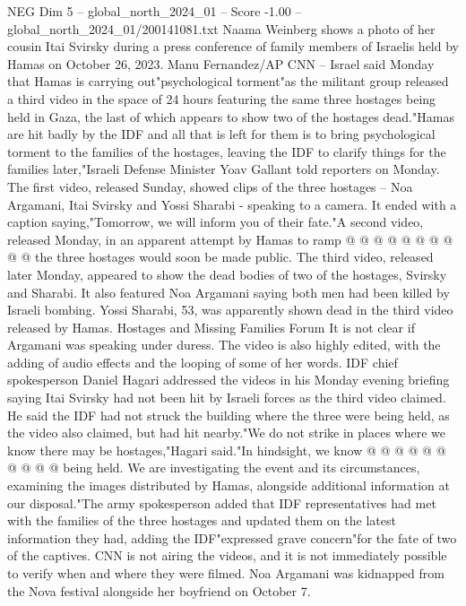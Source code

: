 \begin{textsample}{NEG Dim 5 – global\_north\_2024\_01 – Score -1.00 – global\_north\_2024\_01/200141081.txt}  \label{ex:f5_neg_313}
Naama Weinberg shows a photo of her cousin Itai Svirsky during a press conference of family members of Israelis held by Hamas on October 26, 2023.
Manu Fernandez/AP CNN -- Israel said Monday that Hamas is carrying out"psychological torment"as the militant group released a third video in the space of 24 hours featuring the same three hostages being held in Gaza, the last of which appears to show two of the hostages dead."Hamas are hit badly by the IDF and all that is left for them is to bring psychological torment to the families of the hostages, leaving the IDF to clarify things for the families later,"Israeli Defense Minister Yoav Gallant told reporters on Monday.
The first video, released Sunday, showed clips of the three hostages -- Noa Argamani, Itai Svirsky and Yossi Sharabi - speaking to a camera.
It ended with a caption saying,"Tomorrow, we will inform you of their fate."A second video, released Monday, in an apparent attempt by Hamas to ramp @ @ @ @ @ @ @ @ @ @ the three hostages would soon be made public.
The third video, released later Monday, appeared to show the dead bodies of two of the hostages, Svirsky and Sharabi.
It also featured Noa Argamani saying both men had been killed by Israeli bombing.
Yossi Sharabi, 53, was apparently shown dead in the third video released by Hamas.
Hostages and Missing Families Forum It is not clear if Argamani was speaking under duress.
The video is also highly edited, with the adding of audio effects and the looping of some of her words.
IDF chief spokesperson Daniel Hagari addressed the videos in his Monday evening briefing saying Itai Svirsky had not been hit by Israeli forces as the third video claimed.
He said the IDF had not struck the building where the three were being held, as the video also claimed, but had hit nearby."We do not strike in places where we know there may be hostages,"Hagari said."In hindsight, we know @ @ @ @ @ @ @ @ @ @ being held.
We are investigating the event and its circumstances, examining the images distributed by Hamas, alongside additional information at our disposal."The army spokesperson added that IDF representatives had met with the families of the three hostages and updated them on the latest information they had, adding the IDF"expressed grave concern"for the fate of two of the captives.
CNN is not airing the videos, and it is not immediately possible to verify when and where they were filmed.
Noa Argamani was kidnapped from the Nova festival alongside her boyfriend on October 7.

\end{textsample}
